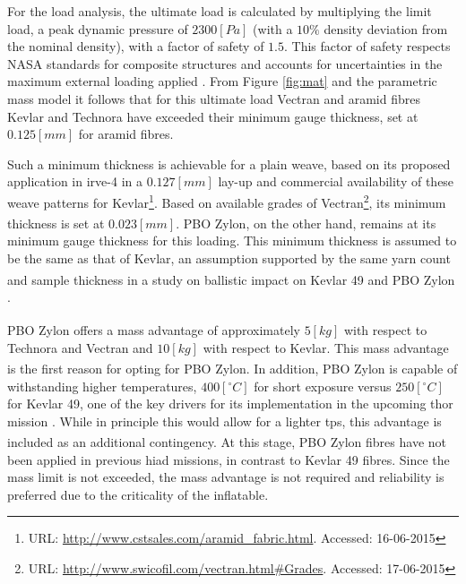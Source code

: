 For the load analysis, the ultimate load is calculated by multiplying the limit load, a peak dynamic pressure of $2300 \left[Pa\right]$ (with a $10\%$ density deviation from the nominal density), with a factor of safety of $1.5$. This factor of safety respects NASA standards for composite structures and accounts for uncertainties in the maximum external loading applied \cite{Technical2014}.  
From Figure \ref{fig:mat} and the parametric mass model it follows that for this ultimate load Vectran and aramid fibres Kevlar and Technora have exceeded their minimum gauge thickness, set at $0.125 \left[mm\right]$ for aramid fibres. 

Such a minimum thickness is achievable for a plain weave, based on its proposed application in \gls{irve}-4 in a $0.127 \left[mm\right]$ lay-up \cite{Litton2011} and commercial availability of these weave patterns for Kevlar\footnote{URL: \url{http://www.cstsales.com/aramid_fabric.html}. Accessed: 16-06-2015}. Based on available grades of Vectran\footnote{URL: \url{http://www.swicofil.com/vectran.html\#Grades}. Accessed: 17-06-2015}, its minimum thickness is set at $0.023 \left[mm\right]$. PBO Zylon\textsuperscript{\textregistered}, on the other hand, remains at its minimum gauge thickness for this loading. This minimum thickness is assumed to be the same as that of Kevlar, an assumption supported by the same yarn count and sample thickness in a study on ballistic impact on Kevlar 49 and PBO Zylon\textsuperscript{\textregistered} \cite{Pereira2009}. 

PBO Zylon\textsuperscript{\textregistered} offers a mass advantage of approximately $5 \left[kg\right]$ with respect to Technora and Vectran and $10 \left[kg\right]$ with respect to Kevlar. This mass advantage is the first reason for opting for PBO Zylon\textsuperscript{\textregistered}. In addition, PBO Zylon\textsuperscript{\textregistered} is capable of withstanding higher temperatures, $400 \left[^{\circ}C\right]$ for short exposure versus $250 \left[^{\circ}C\right]$ for Kevlar 49, one of the key drivers for its implementation in the upcoming \gls{thor} mission \cite{Dillman2014}. While in principle this would allow for a lighter \gls{tps}, this advantage is included as an additional contingency. At this stage, PBO Zylon\textsuperscript{\textregistered} fibres have not been applied in previous \gls{hiad} missions, in contrast to Kevlar 49 fibres. Since the mass limit is not exceeded, the mass advantage is not required and reliability is preferred due to the criticality of the inflatable. 

